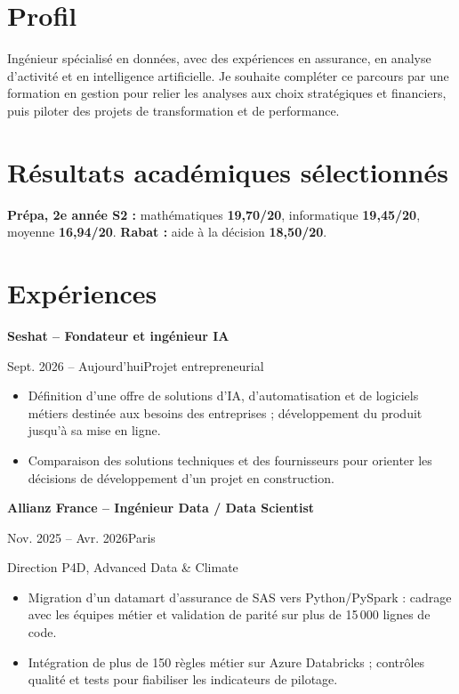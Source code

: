 \documentclass[10pt,a4paper]{article}
\newcommand{\role}[3]{\vspace{4pt}\textbf{#1}\par {\color{muted}#2\enspace\textbullet\enspace #3}\par}
\begin{document}
\begin{minipage}[t]{0.68\textwidth}
\vspace{-10pt}\raggedright
\section{Profil}
Ingénieur spécialisé en données, avec des expériences en assurance, en analyse d'activité et en intelligence artificielle. Je souhaite compléter ce parcours par une formation en gestion pour relier les analyses aux choix stratégiques et financiers, puis piloter des projets de transformation et de performance.

\section{Résultats académiques sélectionnés}
\textbf{Prépa, 2e année S2 :} mathématiques \textbf{19,70/20}, informatique \textbf{19,45/20}, moyenne \textbf{16,94/20}. \textbf{Rabat :} aide à la décision \textbf{18,50/20}.

\section{Expériences}
\role{Seshat -- Fondateur et ingénieur IA}{Sept. 2026 -- Aujourd'hui}{Projet entrepreneurial}
\begin{itemize}
\item Définition d'une offre de solutions d'IA, d'automatisation et de logiciels métiers destinée aux besoins des entreprises ; développement du produit jusqu'à sa mise en ligne.
\item Comparaison des solutions techniques et des fournisseurs pour orienter les décisions de développement d'un projet en construction.
\end{itemize}

\role{Allianz France -- Ingénieur Data / Data Scientist}{Nov. 2025 -- Avr. 2026}{Paris}
{\color{muted}Direction P4D, Advanced Data \& Climate}\par
\begin{itemize}
\item Migration d'un datamart d'assurance de SAS vers Python/PySpark : cadrage avec les équipes métier et validation de parité sur plus de 15\,000 lignes de code.
\item Intégration de plus de 150 règles métier sur Azure Databricks ; contrôles qualité et tests pour fiabiliser les indicateurs de pilotage.
\end{itemize}


\end{minipage}
\end{document}
